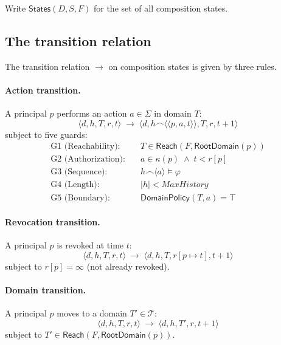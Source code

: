\documentclass[11pt,a4paper]{article}
\theoremstyle{plain}
\theoremstyle{definition}
\theoremstyle{remark}
\begin{document}
Write $\mathsf{States}(D, S, F)$ for the set of all composition states.

\subsection{The transition relation}

The transition relation $\to$ on composition states is given by three rules.

\paragraph{Action transition.} A principal $p$ performs an action $a \in
\Sigma$ in domain $T$:
\begin{equation*}
\langle d, h, T, r, t \rangle \;\to\; \langle d, h \frown \langle \langle p, a, t \rangle \rangle, T, r, t + 1 \rangle
\end{equation*}
subject to five guards:
\begin{align*}
\text{G1 (Reachability):} & \quad T \in \mathsf{Reach}(F, \mathsf{RootDomain}(p)) \\
\text{G2 (Authorization):} & \quad a \in \kappa(p) \;\wedge\; t < r[p] \\
\text{G3 (Sequence):} & \quad h \frown \langle a \rangle \models \varphi \\
\text{G4 (Length):} & \quad |h| < \mathit{MaxHistory} \\
\text{G5 (Boundary):} & \quad \mathsf{DomainPolicy}(T, a) = \top
\end{align*}

\paragraph{Revocation transition.} A principal $p$ is revoked at time $t$:
\begin{equation*}
\langle d, h, T, r, t \rangle \;\to\; \langle d, h, T, r[p \mapsto t], t + 1 \rangle
\end{equation*}
subject to $r[p] = \infty$ (not already revoked).

\paragraph{Domain transition.} A principal $p$ moves to a domain $T' \in
\mathcal{T}$:
\begin{equation*}
\langle d, h, T, r, t \rangle \;\to\; \langle d, h, T', r, t + 1 \rangle
\end{equation*}
subject to $T' \in \mathsf{Reach}(F, \mathsf{RootDomain}(p))$.
\end{document}
